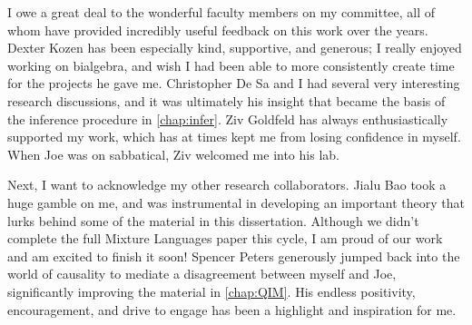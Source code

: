 

I owe a great deal to the wonderful faculty members on my committee, 
    all of whom have provided incredibly useful feedback on this work over the years. 
Dexter Kozen has been especially kind, supportive, and generous;  
    I really enjoyed working on bialgebra, 
    and wish I had been able to more consistently create time for the projects he gave me.
Christopher De Sa 
    and I had several very interesting research discussions,
    and it was ultimately his insight that became the basis of the inference procedure in \cref{chap:infer}. 
Ziv Goldfeld has always enthusiastically supported my work, 
        which has at times kept me from losing confidence in myself. 
    When Joe was on sabbatical, Ziv welcomed me into his lab. 


Next, I want to acknowledge my other research collaborators.
Jialu Bao
    took a huge gamble on me, and was instrumental in developing an important theory that lurks behind some of the material in this dissertation.
    Although we didn't complete the full Mixture Languages paper this cycle,
        I am proud of our work and am excited to finish it soon!
Spencer Peters
    generously jumped back into the world of causality to 
    mediate a disagreement between myself and Joe,
    significantly improving 
        the material in \cref{chap:QIM}.
His endless positivity, encouragement, and drive to engage has been a highlight and inspiration for me.  



